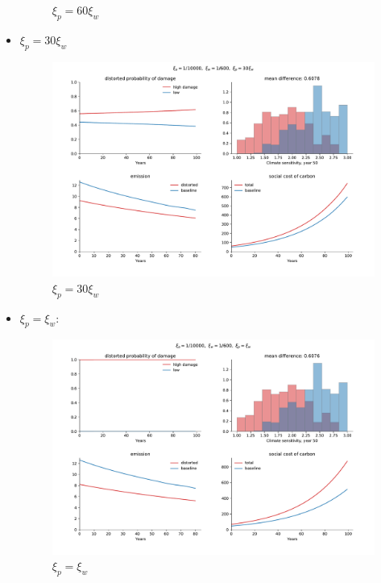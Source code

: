 \documentclass{article}
\begin{document}
\begin{itemize}
\begin{figure}[H]
            \caption{$\xi_p=60\xi_w$}
            \label{fig:notebook/10_600_60}  
        \end{figure}
        \newpage
\item $\xi_p=30\xi_w$
    \begin{figure}[H]
        \centering
        \includegraphics[width=\linewidth]{notebook/10_600_30.pdf}
        \caption{$\xi_p= 30\xi_w$}
        \label{fig:notebook/10_600_30}
    \end{figure}
    \newpage
\item$\xi_p= \xi_w$:
       \begin{figure}[H]
           \centering
           \includegraphics[width=\linewidth]{notebook/10_600_1.pdf}
           \caption{$\xi_p= \xi_w$}
           \label{fig:notebook/10_600_1}
       \end{figure}
\end{itemize}
\end{document}
